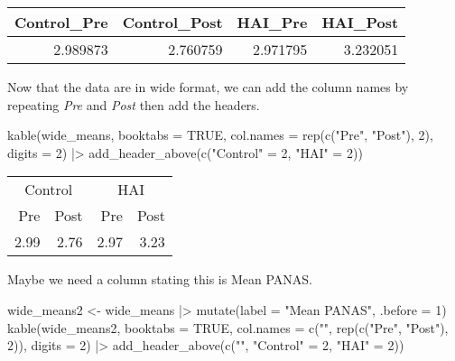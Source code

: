 \documentclass[
  doc]{apa6}
\newenvironment{Shaded}{\begin{snugshade}}{\end{snugshade}}
\newcommand{\AttributeTok}[1]{\textcolor[rgb]{0.77,0.63,0.00}{#1}}
\newcommand{\ConstantTok}[1]{\textcolor[rgb]{0.00,0.00,0.00}{#1}}
\newcommand{\DecValTok}[1]{\textcolor[rgb]{0.00,0.00,0.81}{#1}}
\newcommand{\FunctionTok}[1]{\textcolor[rgb]{0.00,0.00,0.00}{#1}}
\newcommand{\NormalTok}[1]{#1}
\newcommand{\OtherTok}[1]{\textcolor[rgb]{0.56,0.35,0.01}{#1}}
\newcommand{\SpecialCharTok}[1]{\textcolor[rgb]{0.00,0.00,0.00}{#1}}
\newcommand{\StringTok}[1]{\textcolor[rgb]{0.31,0.60,0.02}{#1}}
\begin{document}
\begin{tabular}{rrrr}
\toprule
Control\_Pre & Control\_Post & HAI\_Pre & HAI\_Post\\
\midrule
2.989873 & 2.760759 & 2.971795 & 3.232051\\
\bottomrule
\end{tabular}

Now that the data are in wide format, we can add the column names by repeating \emph{Pre} and \emph{Post} then add the headers.

\begin{Shaded}
\begin{Highlighting}[]
\FunctionTok{kable}\NormalTok{(wide\_means, }
      \AttributeTok{booktabs =} \ConstantTok{TRUE}\NormalTok{, }
      \AttributeTok{col.names =} \FunctionTok{rep}\NormalTok{(}\FunctionTok{c}\NormalTok{(}\StringTok{"Pre"}\NormalTok{, }\StringTok{"Post"}\NormalTok{), }\DecValTok{2}\NormalTok{),}
      \AttributeTok{digits =} \DecValTok{2}\NormalTok{) }\SpecialCharTok{|\textgreater{}}
  \FunctionTok{add\_header\_above}\NormalTok{(}\FunctionTok{c}\NormalTok{(}\StringTok{"Control"} \OtherTok{=} \DecValTok{2}\NormalTok{, }\StringTok{"HAI"} \OtherTok{=} \DecValTok{2}\NormalTok{))}
\end{Highlighting}
\end{Shaded}

\begin{tabular}{rrrr}
\toprule
\multicolumn{2}{c}{Control} & \multicolumn{2}{c}{HAI} \\
\cmidrule(l{3pt}r{3pt}){1-2} \cmidrule(l{3pt}r{3pt}){3-4}
Pre & Post & Pre & Post\\
\midrule
2.99 & 2.76 & 2.97 & 3.23\\
\bottomrule
\end{tabular}

Maybe we need a column stating this is Mean PANAS.

\begin{Shaded}
\begin{Highlighting}[]
\NormalTok{wide\_means2 }\OtherTok{\textless{}{-}}\NormalTok{ wide\_means }\SpecialCharTok{|\textgreater{}} 
  \FunctionTok{mutate}\NormalTok{(}\AttributeTok{label =} \StringTok{"Mean PANAS"}\NormalTok{, }\AttributeTok{.before =} \DecValTok{1}\NormalTok{)}
\FunctionTok{kable}\NormalTok{(wide\_means2, }
      \AttributeTok{booktabs =} \ConstantTok{TRUE}\NormalTok{, }
      \AttributeTok{col.names =} \FunctionTok{c}\NormalTok{(}\StringTok{""}\NormalTok{, }\FunctionTok{rep}\NormalTok{(}\FunctionTok{c}\NormalTok{(}\StringTok{"Pre"}\NormalTok{, }\StringTok{"Post"}\NormalTok{), }\DecValTok{2}\NormalTok{)),}
      \AttributeTok{digits =} \DecValTok{2}\NormalTok{) }\SpecialCharTok{|\textgreater{}}
  \FunctionTok{add\_header\_above}\NormalTok{(}\FunctionTok{c}\NormalTok{(}\StringTok{""}\NormalTok{, }\StringTok{"Control"} \OtherTok{=} \DecValTok{2}\NormalTok{, }\StringTok{"HAI"} \OtherTok{=} \DecValTok{2}\NormalTok{))}
\end{Highlighting}
\end{Shaded}
\end{document}
